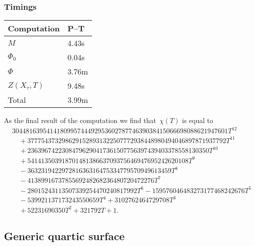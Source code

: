 \documentclass[a4paper,11pt]{article}
\numberwithin{equation}{section}
\theoremstyle{definition}
\begin{document}
\subsubsection{Timings}

\begin{center}
\begin{tabular}{l l} \toprule
Computation     & P--T \\ \midrule
$M$             & 4.43s     \\
$\Phi_0$        & 0.04s     \\
$\Phi$          & 3.76m     \\
$Z(X_{\tau},T)$ & 9.48s     \\
Total           & 3.99m     \\ \bottomrule
\end{tabular}
\end{center}

As the final result of the computation we find that~$\chi(T)$ is equal to 
\begin{equation*}
\begin{split}
& 304481639541418099574449295360278774639038415066698088621947601 T^{12} \\
& \quad + 3777543732986291528931322507772938448980494046897871937792 T^{11} \\
& \quad + 23639674223084796290417361507756397439403378558130350 T^{10} \\ 
& \quad + 54141350391870148138663709375646947695242620108 T^9 \\
& \quad - 363231942297281636316475334779570949613459 T^8 \\
& \quad - 4138991673785569248268236480720472276 T^7 \\
& \quad - 28015243113507339254470240817992 T^6 - 159576046483273177468242676 T^5 \\ 
& \quad - 539921137173243550659 T^4 + 3102762464729708 T^3 \\
& \quad + 52231690350 T^2 + 321792 T + 1.
\end{split}
\end{equation*}

\subsection{Generic quartic surface}
\end{document}
